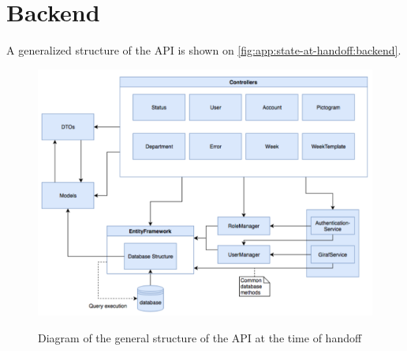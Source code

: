 \section{Backend}\label{app:state-at-handoff:backend}

A generalized structure of the API is shown on \autoref{fig:app:state-at-handoff:backend}.

\begin{figure}[h]
    \centering
    \caption{Diagram of the general structure of the API at the time of handoff}
    \includegraphics[width=1\textwidth]{figures/api_gen_struct_ho.png}
    \label{fig:app:state-at-handoff:backend}
\end{figure}

